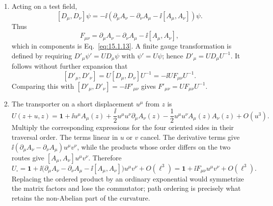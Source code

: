 
\begin{enumerate}
  \begin{enumerate}
    \item[(a)]
    Acting on a test field,
    \[
      [D_\mu,D_\nu]\psi
        =-\ii\left(\partial_\mu A_\nu-\partial_\nu A_\mu
          -\ii[A_\mu,A_\nu]\right)\psi .
    \]
    Thus
    \[
      F_{\mu\nu}
        =\partial_\mu A_\nu-\partial_\nu A_\mu-\ii[A_\mu,A_\nu],
    \]
    which in components is Eq.~\eqref{eq:15.1.13}.  A finite gauge
    transformation is defined by requiring
    \(D'_\mu\psi'=UD_\mu\psi\) with \(\psi'=U\psi\); hence
    \(D'_\mu=UD_\mu U^{-1}\).  It follows without further expansion that
    \[
      [D'_\mu,D'_\nu]
        =U[D_\mu,D_\nu]U^{-1}
        =-\ii UF_{\mu\nu}U^{-1}.
    \]
    Comparing this with
    \([D'_\mu,D'_\nu]=-\ii F'_{\mu\nu}\) gives
    \(F'_{\mu\nu}=UF_{\mu\nu}U^{-1}\).
    \item[(b)]
    The transporter on a short displacement \(u^\mu\) from \(z\) is
    \[
      U(z+u,z)
        =\mathbf{1}+\ii u^\mu A_\mu(z)
         +\frac{\ii}{2}u^\mu u^\nu\partial_\mu A_\nu(z)
         -\frac12u^\mu u^\nu A_\mu(z)A_\nu(z)+O(u^3).
    \]
    Multiply the corresponding expressions for the four oriented sides in
    their traversal order.  The terms linear in \(u\) or \(v\) cancel.  The
    derivative terms give
    \(\ii(\partial_\mu A_\nu-\partial_\nu A_\mu)u^\mu v^\nu\), while the
    products whose order differs on the two routes give
    \([A_\mu,A_\nu]u^\mu v^\nu\).  Therefore
    \[
      U_\square
        =\mathbf{1}+\ii\bigl(\partial_\mu A_\nu-\partial_\nu A_\mu
          -\ii[A_\mu,A_\nu]\bigr)u^\mu v^\nu+O(\ell^3)
        =\mathbf{1}+\ii F_{\mu\nu}u^\mu v^\nu+O(\ell^3).
    \]
    Replacing the ordered product by an ordinary exponential would
    symmetrize the matrix factors and lose the commutator; path ordering is
    precisely what retains the non-Abelian part of the curvature.
  \end{enumerate}


\end{enumerate}
